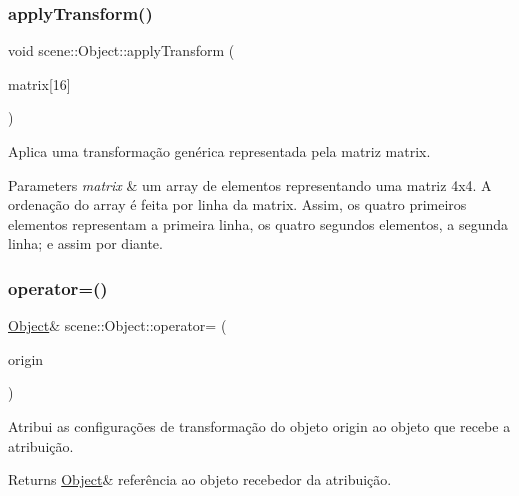 \subsubsection{\texorpdfstring{apply\+Transform()}{applyTransform()}}
{\footnotesize\ttfamily void scene\+::\+Object\+::apply\+Transform (\begin{DoxyParamCaption}\item[{G\+Lfloat}]{matrix\mbox{[}16\mbox{]} }\end{DoxyParamCaption})\hspace{0.3cm}{\ttfamily [inline]}}

Aplica uma transformação genérica representada pela matriz {\ttfamily matrix}. 
\begin{DoxyParams}{Parameters}
{\em matrix} & um array de {} elementos representando uma matriz 4x4. A ordenação do array é feita por linha da matrix. Assim, os quatro primeiros elementos representam a primeira linha, os quatro segundos elementos, a segunda linha; e assim por diante. \\
\hline
\end{DoxyParams}
\mbox{\label{classscene_1_1_object_ad1368be6ce1cded380489daa281091b2}} 
\subsubsection{\texorpdfstring{operator=()}{operator=()}}
{\footnotesize\ttfamily \mbox{\hyperlink{classscene_1_1_object}{Object}}\& scene\+::\+Object\+::operator= (\begin{DoxyParamCaption}\item[{const \mbox{\hyperlink{classscene_1_1_object}{Object}} \&}]{origin }\end{DoxyParamCaption})\hspace{0.3cm}{\ttfamily [inline]}}

Atribui as configurações de transformação do objeto {\ttfamily origin} ao objeto que recebe a atribuição. \begin{DoxyReturn}{Returns}
\mbox{\hyperlink{classscene_1_1_object}{Object}}\& referência ao objeto recebedor da atribuição. 
\end{DoxyReturn}
\mbox{\label{classscene_1_1_object_a09626943cc3ea30e4b2d446675ce7e7c}} 
